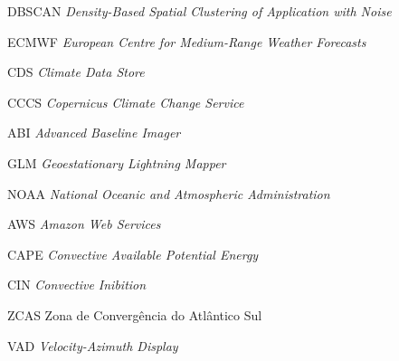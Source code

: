 \begin{siglas}
  \item[DBSCAN] \textit{Density-Based Spatial Clustering of Application with Noise}
  \item[ECMWF] \textit{European Centre for Medium-Range Weather Forecasts}
  \item[CDS] \textit{Climate Data Store}
  \item[CCCS] \textit{Copernicus Climate Change Service}
  \item[ABI] \textit{Advanced Baseline Imager}
  \item[GLM] \textit{Geoestationary Lightning Mapper}
  \item[NOAA] \textit{National Oceanic and Atmospheric Administration}
  \item[AWS] \textit{Amazon Web Services}
  \item[CAPE] \textit{Convective Available Potential Energy}
  \item[CIN] \textit{Convective Inibition}
  \item[ZCAS] Zona de Convergência do Atlântico Sul
  \item[VAD] \textit{Velocity-Azimuth Display}
\end{siglas}
